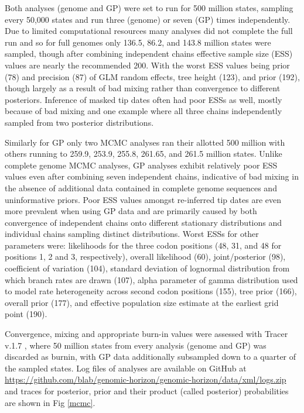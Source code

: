 \documentclass[11pt,oneside,letterpaper]{article}
\begin{document}
Both analyses (genome and GP) were set to run for 500 million states, sampling  every 50,000 states and run three (genome) or seven (GP) times independently.
Due to limited computational resources many analyses did not complete the full run and so for full genomes only 136.5, 86.2, and 143.8 million states were sampled, though after combining independent chains effective sample size (ESS) values are nearly the recommended 200.
With the worst ESS values being prior (78) and precision (87) of GLM random effects, tree height (123), and prior (192), though largely as a result of bad mixing rather than convergence to different posteriors.
Inference of masked tip dates often had poor ESSs as well, mostly because of bad mixing and one example where all three chains independently sampled from two posterior distributions.

Similarly for GP only two MCMC analyses ran their allotted 500 million with others running to 259.9, 253.9, 255.8, 261.65, and 261.5 million states.
Unlike complete genome MCMC analyses, GP analyses exhibit relatively poor ESS values even after combining seven independent chains, indicative of bad mixing in the absence of additional data contained in complete genome sequences and uninformative priors.
Poor ESS values amongst re-inferred tip dates are even more prevalent when using GP data and are primarily caused by both convergence of independent chains onto different stationary distributions and individual chains sampling distinct distributions.
Worst ESSs for other parameters were: likelihoods for the three codon positions (48, 31, and 48 for positions 1, 2 and 3, respectively), overall likelihood (60), joint/posterior (98), coefficient of variation (104), standard deviation of lognormal distribution from which branch rates are drawn (107), alpha parameter of gamma distribution used to model rate heterogeneity across second codon positions (155), tree prior (166), overall prior (177), and effective population size estimate at the earliest grid point (190).

Convergence, mixing and appropriate burn-in values were assessed with Tracer v.1.7 \citep{rambaut_posterior_2018}, where 50 million states from every analysis (genome and GP) was discarded as burnin, with GP data additionally subsampled down to a quarter of the sampled states.
Log files of analyses are available on GitHub at \url{https://github.com/blab/genomic-horizon/genomic-horizon/data/xml/logs.zip} and traces for posterior, prior and their product (called posterior) probabilities are shown in Fig \ref{mcmc}.
\end{document}
